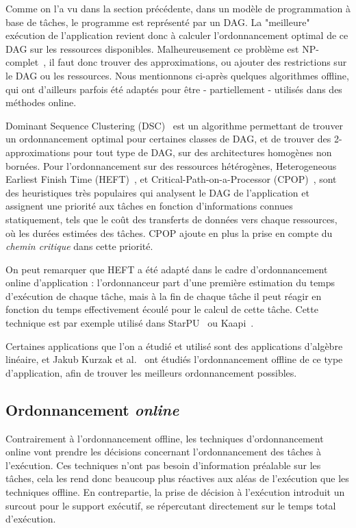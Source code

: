 Comme on l'a vu dans la section précédente, dans un modèle de programmation à base de tâches, le programme est représenté par un DAG.
La "meilleure" exécution de l'application revient donc à calculer l'ordonnancement optimal de ce DAG sur les ressources disponibles.
Malheureusement ce problème est NP-complet~\cite{Cook1971}, il faut donc trouver des approximations, ou ajouter des restrictions sur le DAG ou les ressources.
Nous mentionnons ci-après quelques algorithmes offline, qui ont d'ailleurs parfois été adaptés pour être - partiellement - utilisés dans des méthodes online.

Dominant Sequence Clustering (DSC)~\cite{Yang1994} est un algorithme permettant de trouver un ordonnancement optimal pour certaines classes de DAG, et de trouver des 2-approximations pour tout type de DAG, sur des architectures homogènes non bornées.
Pour l'ordonnancement sur des ressources hétérogènes, Heterogeneous Earliest Finish Time (HEFT)~\cite{HEFT}, et Critical-Path-on-a-Processor (CPOP)~\cite{HEFT}, sont des heuristiques très populaires qui analysent le DAG de l'application et assignent une priorité aux tâches en fonction d'informations connues statiquement, tels que le coût des transferts de données vers chaque ressources, où les durées estimées des tâches.
CPOP ajoute en plus la prise en compte du \emph{chemin critique} dans cette priorité.

On peut remarquer que HEFT a été adapté dans le cadre d'ordonnancement online d'application : l'ordonnanceur part d'une première estimation du temps d'exécution de chaque tâche, mais à la fin de chaque tâche il peut réagir en fonction du temps effectivement écoulé pour le calcul de cette tâche. Cette technique est par exemple utilisé dans StarPU~\cite{StarPU} ou Kaapi~\cite{Lima2015}.

Certaines applications que l'on a étudié et utilisé sont des applications d'algèbre linéaire, et Jakub Kurzak et al.~\cite{Kurzak2010} ont étudiés l'ordonnancement offline de ce type d'application, afin de trouver les meilleurs ordonnancement possibles.



\subsection{Ordonnancement \emph{online}}

Contrairement à l'ordonnancement offline, les techniques d'ordonnancement online vont prendre les décisions concernant l'ordonnancement des tâches à l'exécution.
Ces techniques n'ont pas besoin d'information préalable sur les tâches, cela les rend donc beaucoup plus réactives aux aléas de l'exécution que les techniques offline.
En contrepartie, la prise de décision à l'exécution introduit un surcout pour le support exécutif, se répercutant directement sur le temps total d'exécution.


